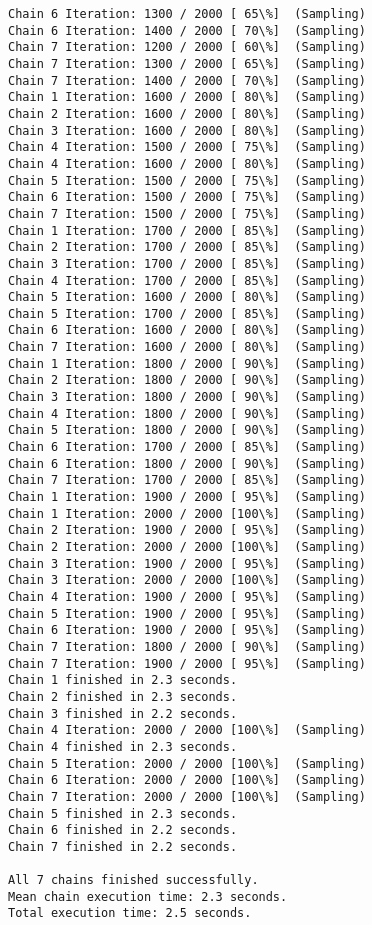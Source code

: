 \documentclass[11pt]{article}
\begin{document}
\begin{Verbatim}[commandchars=\\\{\}]
Chain 6 Iteration: 1300 / 2000 [ 65\%]  (Sampling)
Chain 6 Iteration: 1400 / 2000 [ 70\%]  (Sampling)
Chain 7 Iteration: 1200 / 2000 [ 60\%]  (Sampling)
Chain 7 Iteration: 1300 / 2000 [ 65\%]  (Sampling)
Chain 7 Iteration: 1400 / 2000 [ 70\%]  (Sampling)
Chain 1 Iteration: 1600 / 2000 [ 80\%]  (Sampling)
Chain 2 Iteration: 1600 / 2000 [ 80\%]  (Sampling)
Chain 3 Iteration: 1600 / 2000 [ 80\%]  (Sampling)
Chain 4 Iteration: 1500 / 2000 [ 75\%]  (Sampling)
Chain 4 Iteration: 1600 / 2000 [ 80\%]  (Sampling)
Chain 5 Iteration: 1500 / 2000 [ 75\%]  (Sampling)
Chain 6 Iteration: 1500 / 2000 [ 75\%]  (Sampling)
Chain 7 Iteration: 1500 / 2000 [ 75\%]  (Sampling)
Chain 1 Iteration: 1700 / 2000 [ 85\%]  (Sampling)
Chain 2 Iteration: 1700 / 2000 [ 85\%]  (Sampling)
Chain 3 Iteration: 1700 / 2000 [ 85\%]  (Sampling)
Chain 4 Iteration: 1700 / 2000 [ 85\%]  (Sampling)
Chain 5 Iteration: 1600 / 2000 [ 80\%]  (Sampling)
Chain 5 Iteration: 1700 / 2000 [ 85\%]  (Sampling)
Chain 6 Iteration: 1600 / 2000 [ 80\%]  (Sampling)
Chain 7 Iteration: 1600 / 2000 [ 80\%]  (Sampling)
Chain 1 Iteration: 1800 / 2000 [ 90\%]  (Sampling)
Chain 2 Iteration: 1800 / 2000 [ 90\%]  (Sampling)
Chain 3 Iteration: 1800 / 2000 [ 90\%]  (Sampling)
Chain 4 Iteration: 1800 / 2000 [ 90\%]  (Sampling)
Chain 5 Iteration: 1800 / 2000 [ 90\%]  (Sampling)
Chain 6 Iteration: 1700 / 2000 [ 85\%]  (Sampling)
Chain 6 Iteration: 1800 / 2000 [ 90\%]  (Sampling)
Chain 7 Iteration: 1700 / 2000 [ 85\%]  (Sampling)
Chain 1 Iteration: 1900 / 2000 [ 95\%]  (Sampling)
Chain 1 Iteration: 2000 / 2000 [100\%]  (Sampling)
Chain 2 Iteration: 1900 / 2000 [ 95\%]  (Sampling)
Chain 2 Iteration: 2000 / 2000 [100\%]  (Sampling)
Chain 3 Iteration: 1900 / 2000 [ 95\%]  (Sampling)
Chain 3 Iteration: 2000 / 2000 [100\%]  (Sampling)
Chain 4 Iteration: 1900 / 2000 [ 95\%]  (Sampling)
Chain 5 Iteration: 1900 / 2000 [ 95\%]  (Sampling)
Chain 6 Iteration: 1900 / 2000 [ 95\%]  (Sampling)
Chain 7 Iteration: 1800 / 2000 [ 90\%]  (Sampling)
Chain 7 Iteration: 1900 / 2000 [ 95\%]  (Sampling)
Chain 1 finished in 2.3 seconds.
Chain 2 finished in 2.3 seconds.
Chain 3 finished in 2.2 seconds.
Chain 4 Iteration: 2000 / 2000 [100\%]  (Sampling)
Chain 4 finished in 2.3 seconds.
Chain 5 Iteration: 2000 / 2000 [100\%]  (Sampling)
Chain 6 Iteration: 2000 / 2000 [100\%]  (Sampling)
Chain 7 Iteration: 2000 / 2000 [100\%]  (Sampling)
Chain 5 finished in 2.3 seconds.
Chain 6 finished in 2.2 seconds.
Chain 7 finished in 2.2 seconds.

All 7 chains finished successfully.
Mean chain execution time: 2.3 seconds.
Total execution time: 2.5 seconds.

    \end{Verbatim}
\end{document}

